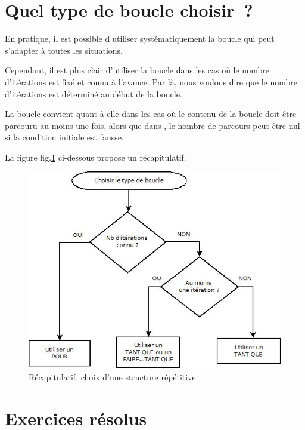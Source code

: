 \section{Quel type de boucle choisir~?}

	En pratique, il est possible d’utiliser systématiquement la boucle  qui peut s’adapter à toutes les situations.  
	
	Cependant, il est plus clair d’utiliser la boucle  dans les cas où
	le nombre d’itérations est fixé et connu à l’avance. Par là, nous voulons
	dire que le nombre d’itérations est déterminé au début de la boucle.  
	
	La boucle  convient quant à elle dans les cas où le
	contenu de la boucle doit être parcouru au moins une fois, alors que dans
	, le nombre de parcours peut être nul si la condition initiale
	est fausse.  
	
	La figure fig.\ref{fig:boucle-choix} ci-dessous propose un récapitulatif.

	\begin{center}
		\begin{figure}[h]
			\centering
			\includegraphics[width=.8\textwidth]{images/boucle-choixtype}
			\caption{Récapitulatif, choix d'une structure répétitive}
			\label{fig:boucle-choix}
		\end{figure}
	\end{center}




\section{Exercices résolus}

